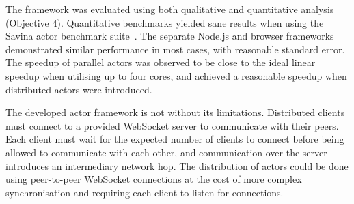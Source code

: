 \documentclass[lettersize,journal]{IEEEtran}
\begin{document}
The framework was evaluated using both qualitative and quantitative analysis (Objective 4). Quantitative benchmarks yielded sane results when using the Savina actor benchmark suite~\cite{savina}. The separate Node.js and browser frameworks demonstrated similar performance in most cases, with reasonable standard error. The speedup of parallel actors was observed to be close to the ideal linear speedup when utilising up to four cores, and achieved a reasonable speedup when distributed actors were introduced. 

The developed actor framework is not without its limitations. Distributed clients must connect to a provided WebSocket server to communicate with their peers. Each client must wait for the expected number of clients to connect before being allowed to communicate with each other, and communication over the server introduces an intermediary network hop. The distribution of actors could be done using peer-to-peer WebSocket connections at the cost of more complex synchronisation and requiring each client to listen for connections.


\end{document}
